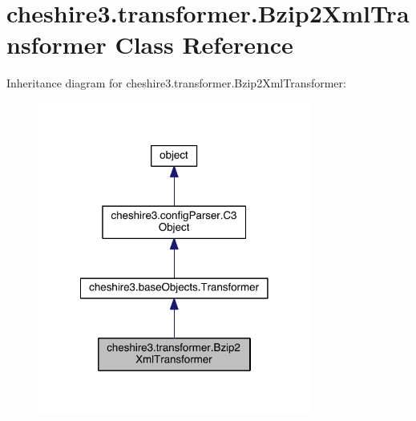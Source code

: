 \hypertarget{classcheshire3_1_1transformer_1_1_bzip2_xml_transformer}{\section{cheshire3.\-transformer.\-Bzip2\-Xml\-Transformer Class Reference}
\label{classcheshire3_1_1transformer_1_1_bzip2_xml_transformer}
}


Inheritance diagram for cheshire3.\-transformer.\-Bzip2\-Xml\-Transformer\-:
\nopagebreak
\begin{figure}[H]
\begin{center}
\leavevmode
\includegraphics[width=254pt]{classcheshire3_1_1transformer_1_1_bzip2_xml_transformer__inherit__graph}
\end{center}
\end{figure}



